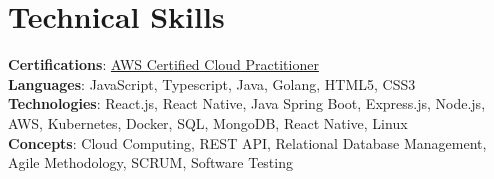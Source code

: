 \section{Technical Skills}
    \begin{itemize}[leftmargin=0.15in, label={}]
	\small{\item{
		\textbf{Certifications}{: \href{https://www.credly.com/badges/b6b11eb9-15a3-4bf0-8542-85e1f57f57ce/linked_in_profile}{AWS Certified Cloud Practitioner}} \\
		\textbf{Languages}{: JavaScript, Typescript, Java, Golang, HTML5, CSS3 } \\
		\textbf{Technologies}{: React.js, React Native, Java Spring Boot, Express.js, Node.js, AWS, Kubernetes, Docker, SQL, MongoDB, React Native, Linux } \\
		\textbf{Concepts}{: Cloud Computing, REST API, Relational Database Management, Agile Methodology, SCRUM,  Software Testing }
	}}
    \end{itemize}